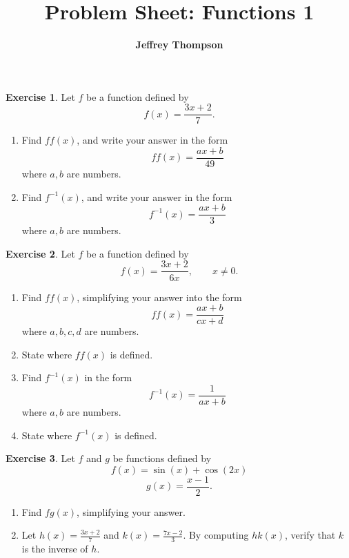 \documentclass[a4paper]{article}
\theoremstyle{plain}
\theoremstyle{definition}
\newtheorem{exercise}{Exercise}
\numberwithin{equation}{subsection}
\begin{document}
\title{\textbf{Problem Sheet: Functions 1}}
\author{\textbf{Jeffrey Thompson}}
\maketitle

\begin{exercise}
Let $f$ be a function defined by
\[
    f(x) = \frac{3x+2}{7}.
\]
\begin{enumerate}
    \item Find $ff(x)$, and write your answer in the form
    \[
        ff(x) = \frac{ax+b}{49}
    \]
    where $a,b$ are numbers.
    \item Find $f^{-1}(x)$, and write your answer in the form
    \[
        f^{-1}(x) = \frac{ax+b}{3}
    \]
    where $a,b$ are numbers.
\end{enumerate}
\end{exercise}

\begin{exercise}
Let $f$ be a function defined by
\[
    f(x) = \frac{3x+2}{6x}, \qquad x \neq 0.
\]
\begin{enumerate}
    \item Find $ff(x)$, simplifying your answer into the form
    \[
        ff(x) = \frac{ax+b}{cx+d}
    \]
    where $a,b,c,d$ are numbers.
    \item State where $ff(x)$ is defined.
    \item Find $f^{-1}(x)$ in the form
    \[
        f^{-1}(x) = \frac{1}{ax+b}
    \]
    where $a,b$ are numbers.
    \item State where $f^{-1}(x)$ is defined.
\end{enumerate}
\end{exercise}

\begin{exercise}
Let $f$ and $g$ be functions defined by
\[
    f(x) = \sin(x) + \cos(2x)
\]
\[
    g(x) = \frac{x-1}{2}.
\]
\begin{enumerate}
    \item Find $fg(x)$, simplifying your answer.
    \item Let $h(x) = \frac{3x+2}{7}$ and $k(x) = \frac{7x-2}{3}$. By computing $hk(x)$, verify that $k$ is the inverse of $h$.
\end{enumerate}
\end{exercise}
\end{document}
